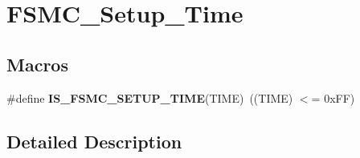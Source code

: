 \hypertarget{group___f_s_m_c___setup___time}{}\section{F\+S\+M\+C\+\_\+\+Setup\+\_\+\+Time}
\label{group___f_s_m_c___setup___time}
\subsection*{Macros}
\begin{DoxyCompactItemize}
\item 
\hypertarget{group___f_s_m_c___setup___time_ga4f2fbb8f6ec492cc241a49c468e0d98d}{}\#define {\bfseries I\+S\+\_\+\+F\+S\+M\+C\+\_\+\+S\+E\+T\+U\+P\+\_\+\+T\+I\+M\+E}(T\+I\+M\+E)~((T\+I\+M\+E) $<$= 0x\+F\+F)\label{group___f_s_m_c___setup___time_ga4f2fbb8f6ec492cc241a49c468e0d98d}

\end{DoxyCompactItemize}


\subsection{Detailed Description}
